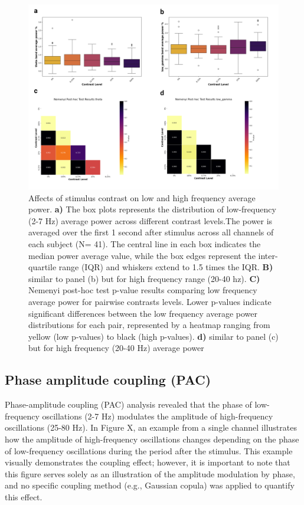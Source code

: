 \documentclass[
  letterpaper,
  DIV=11,
  numbers=noendperiod]{scrartcl}
\begin{document}
\begin{figure}[H]

{\centering \includegraphics[width=7.05208in,height=\textheight]{images/contrast_power.png}

}

\caption{Affects of stimulus contrast on low and high frequency average
power. \textbf{a)} The box plots represents the distribution of
low-frequency (2-7 Hz) average power across different contrast
levels.The power is averaged over the first 1 second after stimulus
across all channels of each subject (N= 41). The central line in each
box indicates the median power average value, while the box edges
represent the inter-quartile range (IQR) and whiskers extend to 1.5
times the IQR. \textbf{B)} similar to panel (b) but for high frequency
range (20-40 hz). \textbf{C)} Nemenyi post-hoc test p-value results
comparing low frequency average power for pairwise contrasts levels.
Lower p-values indicate significant differences between the low
frequency average power distributions for each pair, represented by a
heatmap ranging from yellow (low p-values) to black (high p-values).
\textbf{d)} similar to panel (c) but for high frequency (20-40 Hz)
average power}

\end{figure}%

\subsection{Phase amplitude coupling
(PAC)}\label{phase-amplitude-coupling-pac}

Phase-amplitude coupling (PAC) analysis revealed that the phase of
low-frequency oscillations (2-7 Hz) modulates the amplitude of
high-frequency oscillations (25-80 Hz). In Figure X, an example from a
single channel illustrates how the amplitude of high-frequency
oscillations changes depending on the phase of low-frequency
oscillations during the period after the stimulus. This example visually
demonstrates the coupling effect; however, it is important to note that
this figure serves solely as an illustration of the amplitude modulation
by phase, and no specific coupling method (e.g., Gaussian copula) was
applied to quantify this effect.
\end{document}
